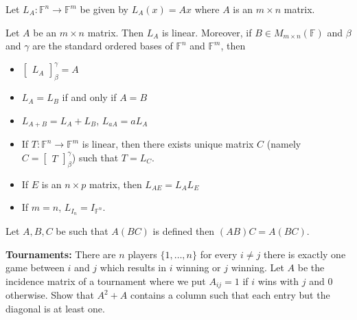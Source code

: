 \documentclass[12pt]{article}
\newenvironment{theorem}[2][Theorem]{\begin{trivlist}
\item[\hskip \labelsep {\bfseries #1}\hskip \labelsep {\bfseries #2.}]}{\end{trivlist}}
\begin{document}
\vspace{1em}

\noindent Let $L_A : \mathbb{F}^n \to \mathbb{F}^m$ be given by $L_A(x) = Ax$ where $A$ is an $m \times n$ matrix.

\begin{theorem}{2.15}
Let $A$ be an $m \times n$ matrix. Then $L_A$ is linear. Moreover, if $B \in M_{m \times n}(\mathbb{F})$ and $\beta$ and $\gamma$ are the standard ordered bases of $\mathbb{F}^n$ and $\mathbb{F}^m$, then

\begin{itemize}
    \item[(a)] $\begin{bmatrix} L_A \end{bmatrix}_\beta^\gamma = A$ 
    
    \item[(b)] $L_A = L_B$ if and only if $A = B$
    
    \item[(c)] $L_{A+B} = L_A + L_B$, $L_{aA} = aL_A$
    
    \item[(d)] If $T : \mathbb{F}^n \to \mathbb{F}^m$ is linear, then there exists unique matrix $C$ (namely $C = \begin{bmatrix} T \end{bmatrix}_\beta^\gamma$) such that $T = L_C$.
    
    \item[(e)] If $E$ is an $n \times p$ matrix, then $L_{AE} = L_AL_E$
    
    \item[(f)] If $m = n$, $L_{I_n} = I_{\mathbb{F}^n}$.
\end{itemize}
\end{theorem}

\begin{theorem}{2.16}
Let $A, B, C$ be such that $A(BC)$ is defined then $(AB)C = A(BC)$.
\end{theorem}

\textbf{Tournaments:} There are $n$ players $\{1, \dots, n\}$ for every $i \neq j$ there is exactly one game between $i$ and $j$ which results in $i$ winning or $j$ winning. Let $A$ be the incidence matrix of a tournament where we put $A_{ij} = 1$ if $i$ wins with $j$ and $0$ otherwise. Show that $A^2 + A$ contains a column such that each entry but the diagonal is at least one.
\end{document}
